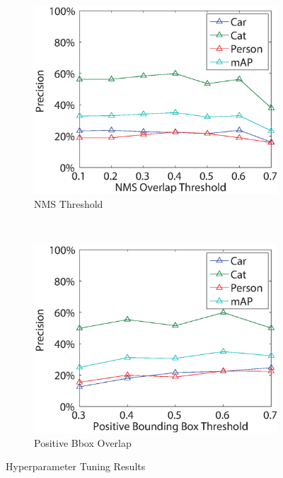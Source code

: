 \documentclass[10pt,twocolumn,letterpaper]{article}
\begin{document}
\begin{figure}
\begin{subfigure}[b]{0.24\textwidth}
                \includegraphics[width=\textwidth]{figures/tuning/nms.eps}
                \caption{NMS Threshold}
                \label{fig:nms_threshold}
        \end{subfigure}
        ~
        \begin{subfigure}[b]{0.24\textwidth}
        \includegraphics[width=\textwidth]{figures/tuning/pos_bbox.eps}
        \caption{Positive Bbox Overlap}
        \label{fig:pos_bbox}
        \end{subfigure}
        
        \caption{Hyperparameter Tuning Results}\label{fig:hyperparam_tuning}
\end{figure}
\end{document}
